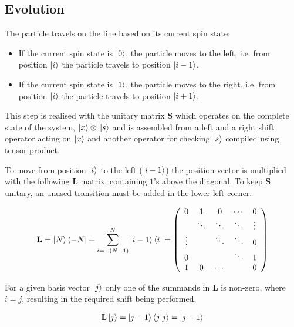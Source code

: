 \subsection{Evolution}

The particle travels on the line based on its current spin state:
\begin{itemize}
\item If the current spin state is $\ket{0}$, the particle moves to the left, i.e. from position $\ket{i}$ the particle travels to position $\ket{i-1}$.
\item If the current spin state is $\ket{1}$, the particle moves to the right, i.e. from position $\ket{i}$ the particle travels to position $\ket{i+1}$.
\end{itemize}

This step is realised with the unitary matrix $\mathbf{S}$ which operates on the complete state of the system, $\ket{x}\otimes{}\ket{s}$ and is assembled from a left and a right shift operator acting on $\ket{x}$ and another operator for checking $\ket{s}$ compiled using tensor product.

\begin{definition}

To move from position $\ket{i}$ to the left ($\ket{i-1}$) the position vector is multiplied with the following $\mathbf{L}$ matrix, containing $1$'s above the diagonal. To keep $\mathbf{S}$ unitary, an unused transition must be added in the lower left corner.


\begin{align}
\label{LeftShift}
\mathbf{L} = \ket{N}\bra{-N} + \sum\limits_{i=-(N-1)}^{N} \ket{i-1}\bra{i} =
\left(
    \begin{array}{ccccc}
        0      & 1      & 0      & \cdots & 0      \\
               & \ddots & \ddots & \ddots & \vdots \\
        \vdots &        & \ddots & \ddots & 0      \\
        0      &        &        & \ddots & 1      \\
        1      & 0      & \cdots &        & 0
      \end{array}
\right)
\end{align}

For a given basis vector $\ket{j}$ only one of the summands in $\mathbf{L}$ is non-zero, where $i=j$, resulting in the required shift being performed.

\begin{align*}
\mathbf{L}\ket{j} = \ket{j-1}\bra{j}\ket{j} = \ket{j-1}
\end{align*}

\end{definition}


